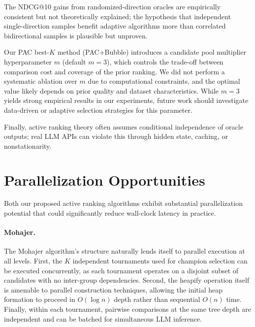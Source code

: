 \documentclass[11pt]{article}
\begin{document}
The NDCG@10 gains from randomized-direction oracles are empirically consistent but not theoretically explained; the hypothesis that independent single-direction samples benefit adaptive algorithms more than correlated bidirectional samples is plausible but unproven.

Our PAC best-$K$ method (PAC+Bubble) introduces a candidate pool multiplier hyperparameter $m$ (default $m=3$), which controls the trade-off between comparison cost and coverage of the prior ranking. We did not perform a systematic ablation over $m$ due to computational constraints, and the optimal value likely depends on prior quality and dataset characteristics. While $m=3$ yields strong empirical results in our experiments, future work should investigate data-driven or adaptive selection strategies for this parameter.

Finally, active ranking theory often assumes conditional independence of oracle outputs; real LLM APIs can violate this through hidden state, caching, or nonstationarity.



\FloatBarrier




\FloatBarrier
\appendix
\section{Parallelization Opportunities}
\label{sec:parallelization}

Both our proposed active ranking algorithms exhibit substantial parallelization potential that could significantly reduce wall-clock latency in practice.

\paragraph{Mohajer.}
The Mohajer algorithm's structure naturally lends itself to parallel execution at all levels.
First, the $K$ independent tournaments used for champion selection can be executed concurrently, as each tournament operates on a disjoint subset of candidates with no inter-group dependencies.
Second, the heapify operation itself is amenable to parallel construction techniques, allowing the initial heap formation to proceed in $O(\log n)$ depth rather than sequential $O(n)$ time.
Finally, within each tournament, pairwise comparisons at the same tree depth are independent and can be batched for simultaneous LLM inference.
\end{document}
